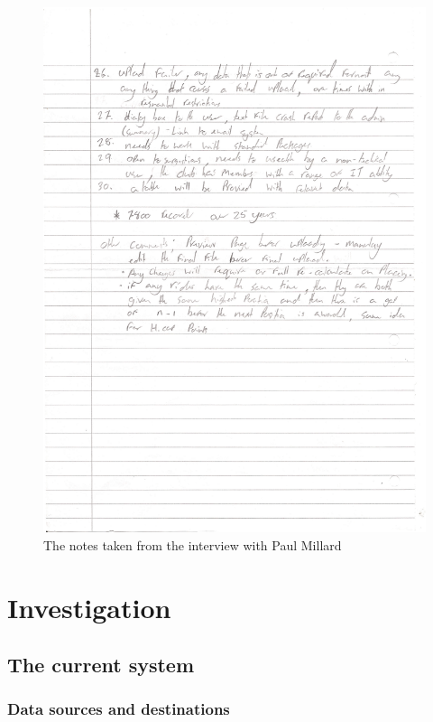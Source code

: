 \begin{figure}[H]
    \includegraphics[width=\textwidth]{./interview/InterviewNotesPage2.pdf}
    \caption{The notes taken from the interview with Paul Millard} \label{fig:Interview notes}
\end{figure}


\section{Investigation}

\subsection{The current system}

\subsubsection{Data sources and destinations}

